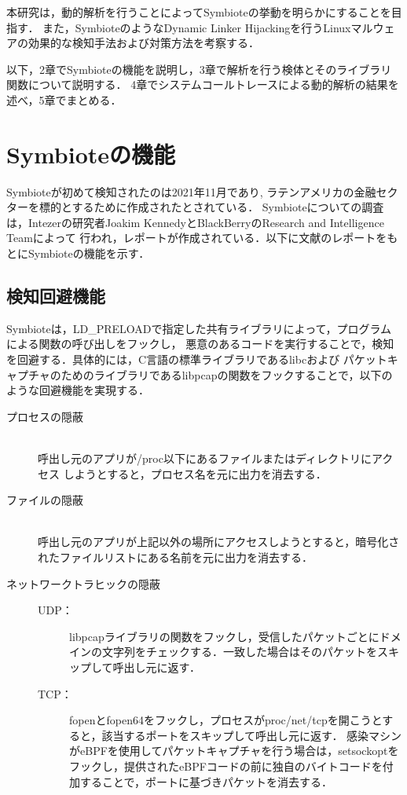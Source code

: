 \documentclass[submit,techreq,noauthor]{eco}	%
\begin{document}
本研究は，動的解析を行うことによってSymbioteの挙動を明らかにすることを目指す．
また，SymbioteのようなDynamic Linker Hijackingを行うLinuxマルウェアの効果的な検知手法および対策方法を考察する．


以下，2章でSymbioteの機能を説明し，3章で解析を行う検体とそのライブラリ関数について説明する．
4章でシステムコールトレースによる動的解析の結果を述べ，5章でまとめる．\\


\section{Symbioteの機能}
Symbioteが初めて検知されたのは2021年11月であり,
ラテンアメリカの金融セクターを標的とするために作成されたとされている．
Symbioteについての調査は，Intezerの研究者Joakim KennedyとBlackBerryのResearch and Intelligence Teamによって
行われ，レポートが作成されている．以下に文献\cite{Symbiote}のレポートをもとにSymbioteの機能を示す．


\subsection{検知回避機能}
Symbioteは，LD\_PRELOADで指定した共有ライブラリによって，プログラムによる関数の呼び出しをフックし，
悪意のあるコードを実行することで，検知を回避する．具体的には，C言語の標準ライブラリであるlibcおよび
パケットキャプチャのためのライブラリであるlibpcapの関数をフックすることで，以下のような回避機能を実現する．
  \begin{description}
    \item [プロセスの隠蔽] \mbox{}\\
    呼出し元のアプリが/proc以下にあるファイルまたはディレクトリにアクセス
    しようとすると，プロセス名を元に出力を消去する．
    \item [ファイルの隠蔽] \mbox{}\\
    呼出し元のアプリが上記以外の場所にアクセスしようとすると，暗号化さ
    れたファイルリストにある名前を元に出力を消去する．
    \item [ネットワークトラヒックの隠蔽] \mbox{}
      \begin{description}
        \item[UDP：] 
        libpcapライブラリの関数をフックし，受信したパケットごとにドメインの文字列をチェックする．一致した場合はそのパケットをスキップして呼出し元に返す．
        \item[TCP：] 
        fopenとfopen64をフックし，プロセスがproc/net/tcpを開こうとすると，該当するポートをスキップして呼出し元に返す．
        感染マシンがeBPFを使用してパケットキャプチャを行う場合は，setsockoptをフックし，提供されたeBPFコードの前に独自のバイトコードを付加することで，ポートに基づきパケットを消去する．
      \end{description}
  \end{description}
\end{document}
